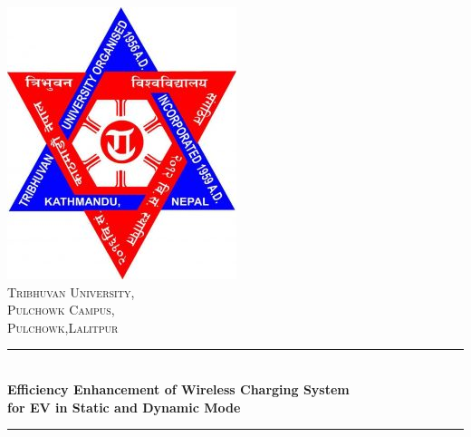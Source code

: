 \begin{titlepage}
	\newcommand{\HRule}{\rule{\linewidth}{1mm}} %
	\center %
	\includegraphics[scale=0.5]{imgs/logo.jpg}\\[1cm] %
	\textsc{\LARGE Tribhuvan University, }\\[0.4cm] %
	\textsc{\Large Pulchowk Campus,}\\[0.4cm] %
	\textsc{\large Pulchowk,Lalitpur}\\[0.4cm] %
	\HRule \\[0.4cm]
	{ \large \bfseries Efficiency Enhancement of Wireless Charging System \\[0.3cm] for EV in Static and Dynamic Mode} \\[0.4cm] %
	\HRule \\[1.5cm]



\end{titlepage}
